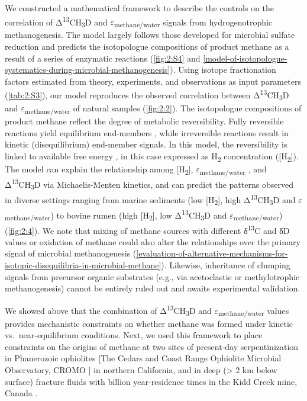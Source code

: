 We constructed a mathematical framework to describe the controls on the
correlation of Δ\textsuperscript{13}CH\textsubscript{3}D and
$\varepsilon$\textsubscript{methane/water} signals from hydrogenotrophic
methanogenesis. The model largely follows those developed for microbial
sulfate reduction \parencite{Rees_1973_GCA,Wing+Halevy_2014_PNAS} and predicts the isotopologue
compositions of product methane as a result of a series of enzymatic
reactions (\autoref{fig:2:S4} and \autoref{model-of-isotopologue-systematics-during-microbial-methanogenesis}). Using isotope fractionation
factors estimated from theory, experiments, and observations as input
parameters (\autoref{tab:2:S3}), our model reproduces the
observed correlation between Δ\textsuperscript{13}CH\textsubscript{3}D
and $\varepsilon$\textsubscript{methane/water} of natural samples (\autoref{fig:2:2}). The
isotopologue compositions of product methane reflect the degree of
metabolic reversibility. Fully reversible reactions yield equilibrium
end-members \parencite{Holler++_2011_PNAS}, while irreversible reactions result in kinetic
(disequilibrium) end-member signals. In this model, the reversibility is
linked to available free energy \parencite{Holler++_2011_PNAS,Wing+Halevy_2014_PNAS}, in this case
expressed as H\textsubscript{2} concentration
({[}H\textsubscript{2}{]}). The model can explain the relationship among
{[}H\textsubscript{2}{]}, $\varepsilon$\textsubscript{methane/water} \parencite{Burke_1993_Chemosphere}, and
Δ\textsuperscript{13}CH\textsubscript{3}D via Michaelis-Menten kinetics,
and can predict the patterns observed in diverse settings ranging from
marine sediments (low {[}H\textsubscript{2}{]}, high
Δ\textsuperscript{13}CH\textsubscript{3}D and
$\varepsilon$\textsubscript{methane/water}) to bovine rumen (high
{[}H\textsubscript{2}{]}, low Δ\textsuperscript{13}CH\textsubscript{3}D
and $\varepsilon$\textsubscript{methane/water}) (\autoref{fig:2:4}). We note that mixing of
methane sources with different δ\textsuperscript{13}C and δD values or
oxidation of methane could also alter the relationships over the primary
signal of microbial methanogenesis (\autoref{evaluation-of-alternative-mechanisms-for-isotopic-disequilibria-in-microbial-methane}). Likewise, inheritance of
clumping signals from precursor organic substrates (e.g., via
acetoclastic or methylotrophic methanogenesis) cannot be entirely ruled
out and awaits experimental validation.

We showed above that the combination of
Δ\textsuperscript{13}CH\textsubscript{3}D and
$\varepsilon$\textsubscript{methane/water} values provides mechanistic constraints
on whether methane was formed under kinetic vs.\ near-equilibrium
conditions. Next, we used this framework to place constraints on the
origins of methane at two sites of present-day serpentinization in
Phanerozoic ophiolites {[}The Cedars \parencite{Morrill++_2013_GCA} and Coast Range
Ophiolite Microbial Observatory, CROMO \parencite{Cardace++_2013_SD}{]} in northern
California, and in deep (\textgreater{} 2 km below surface) fracture
fluids with billion year-residence times in the Kidd Creek mine, Canada
\parencite{SherwoodLollar++_2002_N,Holland++_2013_N}.

